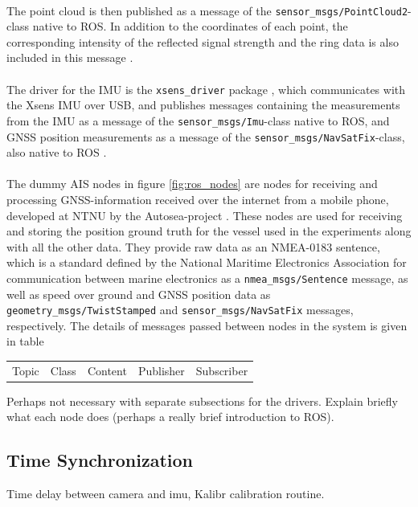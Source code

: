 \vspace{2mm}\\
\noindent The point cloud is then published as a message of the \lstinline[basicstyle=\ttfamily]{sensor_msgs/PointCloud2}-class native to ROS. In addition to the coordinates of each point, the corresponding intensity of the reflected signal strength and the ring data is also included in this message \cite{velodyne_driver}.\\
\vspace{2mm}\\
\noindent The driver for the IMU is the \lstinline[basicstyle=\ttfamily]{xsens_driver} package \cite{xsens_driver}, which communicates with the Xsens IMU over USB, and publishes messages containing the measurements from the IMU as a message of the \lstinline[basicstyle=\ttfamily]{sensor_msgs/Imu}-class native to ROS, and GNSS position measurements as a message of the \lstinline[basicstyle=\ttfamily]{sensor_msgs/NavSatFix}-class, also native to ROS \cite{xsens_driver}.\\
\vspace{2mm}\\
\noindent The dummy AIS nodes in figure \ref{fig:ros_nodes} are nodes for receiving and processing GNSS-information received over the internet from a mobile phone, developed at NTNU by the Autosea-project . These nodes are used for receiving and storing the position ground truth for the vessel used in the experiments along with all the other data. They provide raw data as an NMEA-0183 sentence, which is a standard defined by the National Maritime Electronics Association for communication between marine electronics as a \lstinline[basicstyle=\ttfamily]{nmea_msgs/Sentence} message, as well as speed over ground and GNSS position data as \lstinline[basicstyle=\ttfamily]{geometry_msgs/TwistStamped} and \lstinline[basicstyle=\ttfamily]{sensor_msgs/NavSatFix} messages, respectively.
The details of messages passed between nodes in the system is given in table
\begin{tabular}[H]{|c|c|c|c|c|}
	\centering
	\hline
	Topic & Class & Content & Publisher & Subscriber
\end{tabular}
Perhaps not necessary with separate subsections for the drivers. Explain briefly what each node does (perhaps a really brief introduction to ROS).
\subsection{Time Synchronization}
Time delay between camera and imu, Kalibr calibration routine. 
\cleardoublepage